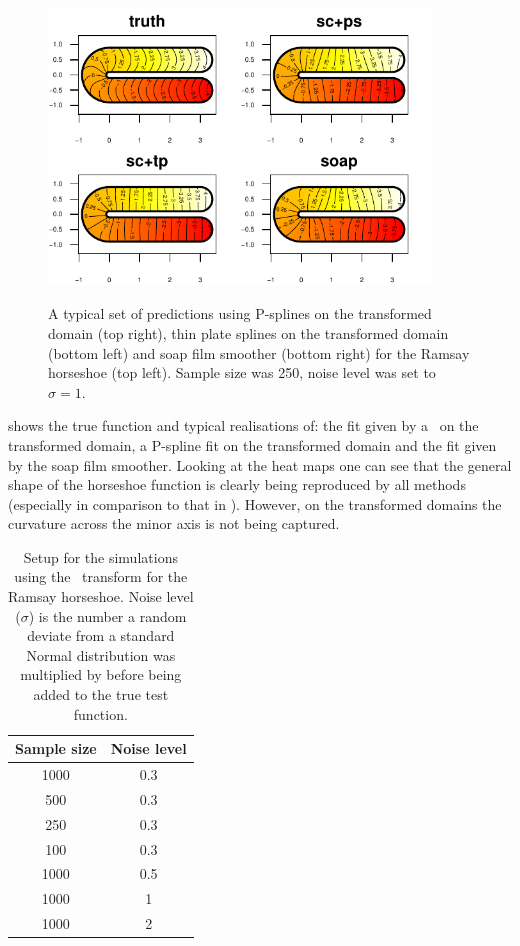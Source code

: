 \begin{figure}
\centering
\includegraphics[width=4in]{sc/figs/compsmooth.pdf} \\
\caption{A typical set of predictions using P-splines on the transformed domain (top right), thin plate splines on the transformed domain (bottom left) and soap film smoother (bottom right) for the Ramsay horseshoe (top left). Sample size was 250, noise level was set to $\sigma=1$.}
\label{compsmooth}
\end{figure}

 shows the true function and typical realisations of: the fit given by a \tprs\ on the transformed domain, a P-spline fit on the transformed domain and the fit given by the soap film smoother. Looking at the heat maps one can see that the general shape of the horseshoe function is clearly being reproduced by all methods (especially in comparison to that in ). However, on the transformed domains the curvature across the minor axis is not being captured.

\begin{table}[tb]
\begin{tabular}{c c}\\
Sample size & Noise level \\
\hline
\hline
1000 & 0.3 \\
500 & 0.3 \\
250 & 0.3 \\
100 & 0.3 \\
1000 & 0.5 \\
1000 & 1 \\
1000 & 2 \\
\end{tabular}
\caption{Setup for the simulations using the \sch\ transform for the Ramsay horseshoe. Noise level ($\sigma$) is the number a random deviate from a standard Normal distribution was multiplied by before being added to the true test function.}
\label{scramsimtable}
\end{table}

